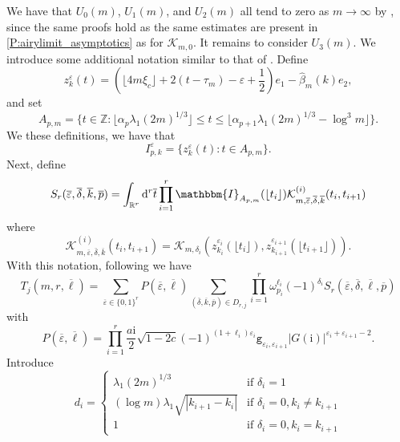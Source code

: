 \documentclass[11pt,twoside]{amsart}
\theoremstyle{plain}
\numberwithin{quest}{section}
\theoremstyle{remark}
\numberwithin{rem}{section}
\theoremstyle{definition}
\newcommand{\eps}{\varepsilon}
\begin{document}
We have that $U_0(m)$, $U_1(m)$, and $U_2(m)$ all tend to zero as $m\to \infty$ by \cite[Lemma 4.1 and Lemma 4.2]{BCJ18}, since the same proofs hold as the same estimates are present in \cref{P:airylimit_asymptotics} as \cite[Proposition 3.1]{BCJ18} for $\mathcal{K}_{m,0}$.  It remains to consider $U_3(m)$.   
We introduce some additional notation similar to that of \cite{BCJ18}. Define 
\begin{equation*}
	z_{k}^{\eps}(t) =(\lfloor 4 m \xi_c \rfloor +2(t-\tau_m)-\eps +\frac{1}{2}) e_1 -\hat{\beta}_m(k)e_2,
\end{equation*}
and set
\begin{equation*}
	A_{p,m}=\{t \in \mathbb{Z}: \lfloor \alpha_p \lambda_1 (2m)^{1/3} \rfloor \leq t \leq  \lfloor \alpha_{p+1} \lambda_1 (2m)^{1/3}-\log^3m \rfloor \}.
\end{equation*}
We these definitions, we have that
\begin{equation*}
	I_{p,k}^{\eps} =\{z_{k}^{\eps}(t): t \in A_{p,m} \}. 
\end{equation*}
Next, define
\begin{equation*}
	S_r(\overline{\eps},\overline{\delta},\overline{k},\overline{p}) =\int_{\mathbb{R}^r} \mathrm{d}^r \overline{t} \prod_{i=1}^r \mathbbm{I}_{A_{p,m}}(\lfloor t_i \rfloor) \mathcal{K}^{(i)}_{m,\overline{\eps},\overline{\delta},\overline{k}} (t_i,t_{i+1}) 
\end{equation*}
where
\begin{equation*}
\mathcal{K}^{(i)}_{m,\overline{\eps},\overline{\delta},\overline{k}} (t_i,t_{i+1}) =\mathcal{K}_{m,\delta_i}(z_{k_i}^{\eps_i}(\lfloor t_i \rfloor),z_{k_{i+1}}^{\eps_{i+1}}(\lfloor t_{i+1}\rfloor)).
\end{equation*}
With this notation, following \cite[(4.7)-(4.10)]{BCJ18} we have 
\begin{equation*}
	T_j(m,r,\overline{\ell})=\sum_{\overline{\eps} \in \{0,1\}^r} P(\overline{\eps},\overline{\ell}) \sum_{(\overline{\delta},\overline{k}, \overline{p})\in D_{r,j}} \prod_{i=1}^r \omega_{p_i}^{\ell_i}(-1)^{\delta_i} S_r(\overline{\eps},\overline{\delta},\overline{\ell}, \overline{p}) 
\end{equation*}
with 
\begin{equation*}
	P(\overline{\eps},\overline{\ell})=\prod_{i=1}^r \frac{a \mathrm{i}}{2} \sqrt{1-2c} (-1)^{(1+\ell_i)\eps_i} \mathtt{g}_{\eps_i,\eps_{i+1}} |G(\mathrm{i})|^{\eps_i+\eps_{i+1}-2}.
\end{equation*}
Introduce 
\begin{equation}\label{E:cumulant:d_i}
	d_i=\left\{ \begin{array}{ll}
		\lambda_1 (2m)^{1/3} & \mbox{if }\delta_i=1 \\
		(\log m)\lambda_1 \sqrt{|k_{i+1}-k_i|} &\mbox{if }\delta_i=0,k_i\not = k_{i+1} \\
		1 &\mbox{if }\delta_i=0,k_i = k_{i+1} \end{array} \right. 
\end{equation}
\end{document}
